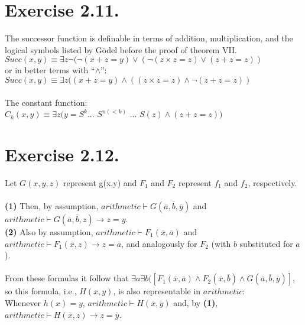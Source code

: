\documentclass{article}
\begin{document}
\section*{Exercise 2.11.}
The successor function is definable in terms of addition, multiplication, and the logical symbols listed by G\"odel before the proof of theorem VII.\\ $Succ(x,y) \equiv\exists z \neg (\neg (x+z=y) \vee (\neg(z\times z=z) \vee (z+z=z))$ \\or in better terms with ``$\wedge$'':\\
$Succ(x,y) \equiv \exists z ((x+z=y) \wedge ((z\times z=z) \wedge \neg(z+z=z))$\\\\
The constant function:\\
$C_{k}(x,y) \equiv \exists z(y = S^{k} ...$ $S^{n(<k)}$ $...$ $S(z) \wedge (z+z=z))$
\section*{Exercise 2.12.}
Let $G(x,y,z)$ represent g(x,y) and $F_1$ and $F_2$ represent $f_1$ and $f_2$, respectively.\\\\
\textbf{(1)} Then, by assumption, $arithmetic \vdash G(\overline{a},\overline{b},\overline{y})$ and $arithmetic \vdash G(\overline{a},\overline{b},z) \rightarrow z = y$.\\
\textbf{(2)} Also by assumption, $arithmetic \vdash F_{1}(\overline{x},\overline{a})$ and $arithmetic \vdash F_{1}(\overline{x},z) \rightarrow z = \overline{a}$, and analogously for $F_{2}$ (with $b$ substituted for $a$).\\\\
From these formulas it follow that $\exists a \exists b([F_{1}(\overline{x},\overline{a}) \wedge F_{2}(\overline{x},\overline{b}) \wedge G(\overline{a},\overline{b},\overline{y})]$, so this formula, i.e., $H(x,y)$, is also representable in $arithmetic$:\\ Whenever $h(x) = y$, $arithmetic \vdash H(\overline{x},\overline{y})$ and, by \textbf{(1)}, \\$arithmetic \vdash H(\overline{x},z) \rightarrow z = \overline{y}$.
\end{document}
